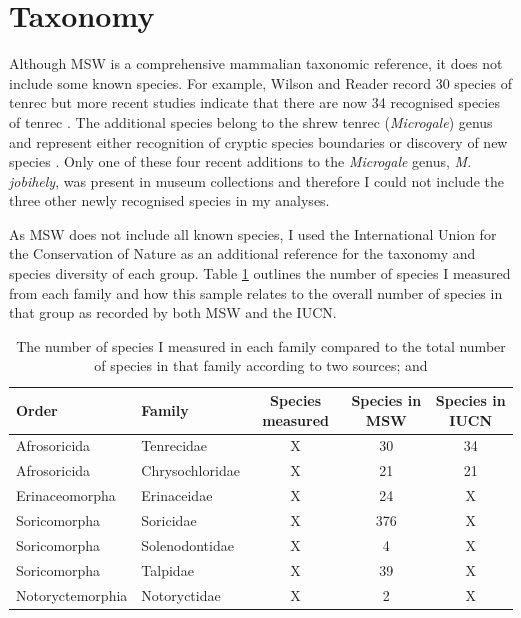 \section{Taxonomy}

Although MSW is a comprehensive mammalian taxonomic reference, it does not include some known species. For example, Wilson and Reader \citeyearpar{Wilson2005} record 30 species of tenrec but more recent studies indicate that there are now 34 recognised species of tenrec \citep{Olson2013}. The additional species belong to the shrew tenrec (\textit{Microgale}) genus and represent either recognition of cryptic species boundaries \citep{Olson2004} or discovery of new species \citep{Goodman2006, Olson2009}. Only one of these four recent additions to the \textit{Microgale} genus, \textit{M. jobihely}, was present in museum collections and therefore I could not include the three other newly recognised species in my analyses.

As MSW does not include all known species, I used the International Union for the Conservation of Nature \citep{IUCN2012} as an additional reference for the taxonomy and species diversity of each group. Table \ref{tab:species.measured} outlines the number of species I measured from each family and how this sample relates to the overall number of species in that group as recorded by both MSW and the IUCN.


\begin{table}[h]
\caption[Summary of species measured] %
{The number of species I measured in each family compared to the total number of species in that family according to two sources; \citep{Wilson2005} and \citep{IUCN2012}}
\begin{tabular}{llccc}
\hline
\textbf{Order} & \textbf{Family} & \textbf{Species measured} & \textbf{Species in MSW} & \textbf{Species in IUCN} \\
\hline
Afrosoricida & Tenrecidae & X & 30 & 34\\
Afrosoricida & Chrysochloridae & X & 21 & 21\\
Erinaceomorpha & Erinaceidae & X & 24 & X\\
Soricomorpha & Soricidae & X & 376 & X\\
Soricomorpha & Solenodontidae & X & 4 & X\\
Soricomorpha & Talpidae & X & 39 & X\\
Notoryctemorphia & Notoryctidae & X & 2 & X\\
\hline
\end{tabular}
\label{tab:species.measured}
\end{table}

